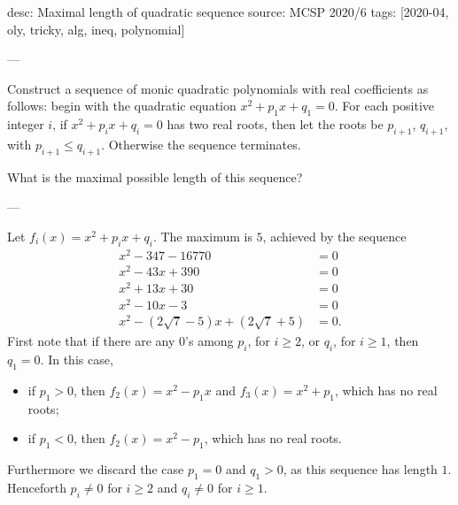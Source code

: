 desc: Maximal length of quadratic sequence
source: MCSP 2020/6
tags: [2020-04, oly, tricky, alg, ineq, polynomial]

---

Construct a sequence of monic quadratic polynomials with real coefficients as follows: begin with the quadratic equation $x^2+p_1x+q_1=0$. For each positive integer $i$, if $x^2+p_ix+q_i=0$ has two real roots, then let the roots be $p_{i+1}$, $q_{i+1}$, with $p_{i+1}\le q_{i+1}$. Otherwise the sequence terminates.

What is the maximal possible length of this sequence?

---

Let $f_i(x)=x^2+p_ix+q_i$. The maximum is $5$, achieved by the sequence
\begin{align*}
    x^2-347-16770&=0\\
    x^2-43x+390&=0\\
    x^2+13x+30&=0\\
    x^2-10x-3&=0\\
    x^2-(2\sqrt7-5)x+(2\sqrt7+5)&=0.
\end{align*}
First note that if there are any $0$'s among $p_i$, for $i\ge2$, or $q_i$, for $i\ge1$, then $q_1=0$. In this case,
\begin{itemize}[itemsep=0em]
    \item if $p_1>0$, then $f_2(x)=x^2-p_1x$ and $f_3(x)=x^2+p_1$, which has no real roots;
    \item if $p_1<0$, then $f_2(x)=x^2-p_1$, which has no real roots.
\end{itemize}
Furthermore we discard the case $p_1=0$ and $q_1>0$, as this sequence has length $1$. Henceforth $p_i\ne0$ for $i\ge2$ and $q_i\ne0$ for $i\ge1$.

